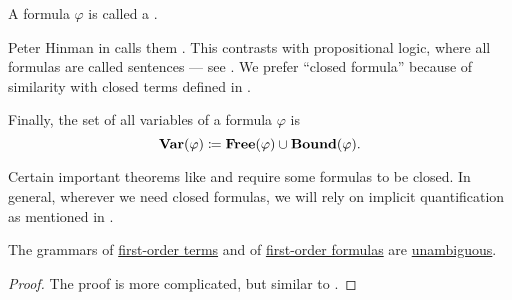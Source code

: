 \begin{definition}
\begin{thmenum}
     A formula \( \varphi \) is called a .

    Peter Hinman in  calls them . This contrasts with propositional logic, where all formulas are called sentences --- see . We prefer \enquote{closed formula} because of similarity with closed terms defined in .

     Finally, the set of all variables of a formula \( \varphi \) is
    \begin{equation*}
      \op*{Var}(\varphi) \coloneqq \op*{Free}(\varphi) \cup \op*{Bound}(\varphi).
    \end{equation*}
  \end{thmenum}
\end{definition}
\begin{comments}
  \item Certain important theorems like  and  require some formulas to be closed. In general, wherever we need closed formulas, we will rely on implicit quantification as mentioned in .
\end{comments}

\begin{proposition}\label{thm:first_order_terms_and_formulas_are_unambiguous}
  The grammars of \hyperref[def:first_order_syntax/term]{first-order terms} and of \hyperref[def:first_order_syntax/formula]{first-order formulas} are \hyperref[def:grammar_ambiguity]{unambiguous}.
\end{proposition}
\begin{proof}
  The proof is more complicated, but similar to .
\end{proof}

